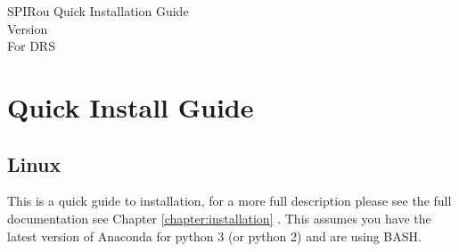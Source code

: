 \ifquickguide
\begin{center}
{{\Huge SPIRou Quick Installation Guide} \\ {\small Version \MyVersionDev \\ For DRS \instrument \MyCodeVersion}}
\end{center}
\else
\chapter{Quick Install Guide}
\label{chapter:quickinstallation}
\fi

\section{Linux}
\label{chapter:quickinstallation:linux}

\noindent This is a quick guide to installation, for a more full description please \ifquickguide see the full documentation \else see Chapter \ref{chapter:installation} \fi. This assumes you have the latest version of Anaconda for python 3 (or python 2) and are using BASH.


